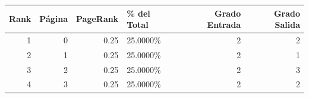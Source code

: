 \begin{tabular}{rrrlrr}
\toprule
   Rank &   Página &   PageRank & \% del Total   &   Grado Entrada &   Grado Salida \\
\midrule
      1 &        0 &       0.25 & 25.0000\%      &               2 &              2 \\
      2 &        1 &       0.25 & 25.0000\%      &               2 &              1 \\
      3 &        2 &       0.25 & 25.0000\%      &               2 &              3 \\
      4 &        3 &       0.25 & 25.0000\%      &               2 &              2 \\
\bottomrule
\end{tabular}